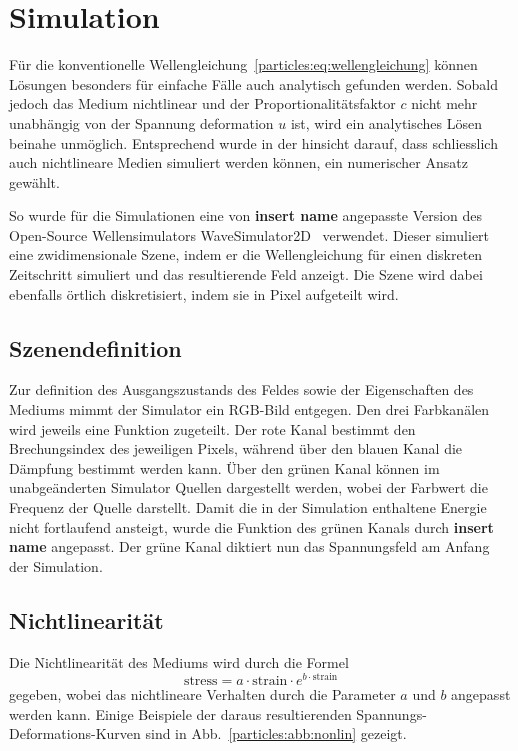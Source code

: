 %
%
%
%
\section{Simulation\label{particles:section:simulation}}

Für die konventionelle Wellengleichung~\ref{particles:eq:wellengleichung} können Lösungen besonders für einfache Fälle auch analytisch gefunden werden.
Sobald jedoch das Medium nichtlinear und der Proportionalitätsfaktor $c$ nicht mehr unabhängig von der Spannung deformation $u$ ist, wird ein analytisches Lösen beinahe unmöglich.
Entsprechend wurde in der hinsicht darauf, dass schliesslich auch nichtlineare Medien simuliert werden können, ein numerischer Ansatz gewählt.

So wurde für die Simulationen eine von \textbf{insert name} angepasste Version des Open-Source Wellensimulators WaveSimulator2D~\cite{repo:wavesim2d} verwendet. %
Dieser simuliert eine zwidimensionale Szene, indem er die Wellengleichung für einen diskreten Zeitschritt simuliert und das resultierende Feld anzeigt.
Die Szene wird dabei ebenfalls örtlich diskretisiert, indem sie in Pixel aufgeteilt wird.


\subsection{Szenendefinition}
Zur definition des Ausgangszustands des Feldes sowie der Eigenschaften des Mediums mimmt der Simulator ein RGB-Bild entgegen.
Den drei Farbkanälen wird jeweils eine Funktion zugeteilt.
Der rote Kanal bestimmt den Brechungsindex des jeweiligen Pixels, während über den blauen Kanal die Dämpfung bestimmt werden kann.
Über den grünen Kanal können im unabgeänderten Simulator Quellen dargestellt werden, wobei der Farbwert die Frequenz der Quelle darstellt.
Damit die in der Simulation enthaltene Energie nicht fortlaufend ansteigt, wurde die Funktion des grünen Kanals durch \textbf{insert name} angepasst. %
Der grüne Kanal diktiert nun das Spannungsfeld am Anfang der Simulation. %

\subsection{Nichtlinearität}
Die Nichtlinearität des Mediums wird durch die Formel
\[
    \text{stress} = a \cdot \text{strain} \cdot e^{b \cdot \text{strain}} %
\]
gegeben, wobei das nichtlineare Verhalten durch die Parameter $a$ und $b$ angepasst werden kann.
Einige Beispiele der daraus resultierenden Spannungs-Deformations-Kurven sind in Abb.~\ref{particles:abb:nonlin} gezeigt. %

